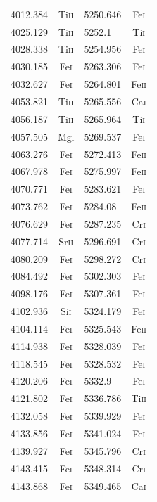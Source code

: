 \begin{longtable}[c]{|l|c|l|c|}
4012.384 & Ti\textsc{ii} & 5250.646 & Fe\textsc{i}\\ 
4025.129 & Ti\textsc{ii} & 5252.1 & Ti\textsc{i}\\   
4028.338 & Ti\textsc{ii} & 5254.956 & Fe\textsc{i}\\ 
4030.185 & Fe\textsc{i} & 5263.306 & Fe\textsc{i}\\  
4032.627 & Fe\textsc{i} & 5264.801 & Fe\textsc{ii}\\ 
4053.821 & Ti\textsc{ii} & 5265.556 & Ca\textsc{i}\\ 
4056.187 & Ti\textsc{ii} & 5265.964 & Ti\textsc{i}\\ 
4057.505 & Mg\textsc{i} & 5269.537 & Fe\textsc{i}\\  
4063.276 & Fe\textsc{i} & 5272.413 & Fe\textsc{ii}\\ 
4067.978 & Fe\textsc{i} & 5275.997 & Fe\textsc{ii}\\ 
4070.771 & Fe\textsc{i} & 5283.621 & Fe\textsc{i}\\  
4073.762 & Fe\textsc{i} & 5284.08 & Fe\textsc{ii}\\  
4076.629 & Fe\textsc{i} & 5287.235 & Cr\textsc{i}\\  
4077.714 & Sr\textsc{ii} & 5296.691 & Cr\textsc{i}\\ 
4080.209 & Fe\textsc{i} & 5298.272 & Cr\textsc{i}\\  
4084.492 & Fe\textsc{i} & 5302.303 & Fe\textsc{i}\\  
4098.176 & Fe\textsc{i} & 5307.361 & Fe\textsc{i}\\  
4102.936 & Si\textsc{i} & 5324.179 & Fe\textsc{i}\\  
4104.114 & Fe\textsc{i} & 5325.543 & Fe\textsc{ii}\\ 
4114.938 & Fe\textsc{i} & 5328.039 & Fe\textsc{i}\\  
4118.545 & Fe\textsc{i} & 5328.532 & Fe\textsc{i}\\  
4120.206 & Fe\textsc{i} & 5332.9 & Fe\textsc{i}\\    
4121.802 & Fe\textsc{i} & 5336.786 & Ti\textsc{ii}\\ 
4132.058 & Fe\textsc{i} & 5339.929 & Fe\textsc{i}\\  
4133.856 & Fe\textsc{i} & 5341.024 & Fe\textsc{i}\\  
4139.927 & Fe\textsc{i} & 5345.796 & Cr\textsc{i}\\  
4143.415 & Fe\textsc{i} & 5348.314 & Cr\textsc{i}\\  
4143.868 & Fe\textsc{i} & 5349.465 & Ca\textsc{i}\\  

\end{longtable}
